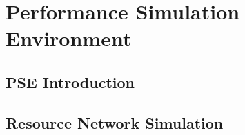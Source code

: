 \chapter{Performance Simulation Environment}
\label{chapter:pse}
\section{PSE Introduction}
\section{Resource Network Simulation}
